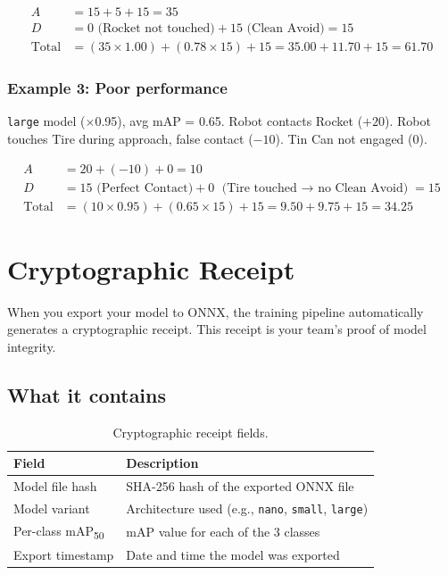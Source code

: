 \documentclass[a4]{article}
\begin{document}
\begin{align*}
A &= 15 + 5 + 15 = 35 \\
D &= 0 \text{ (Rocket not touched)} + 15 \text{ (Clean Avoid)} = 15 \\
\text{Total} &= (35 \times 1.00) + (0.78 \times 15) + 15 = 35.00 + 11.70 + 15 = \mathbf{61.70}
\end{align*}

\subsubsection*{Example 3: Poor performance}

\texttt{large} model ($\times$0.95), avg mAP = 0.65. Robot contacts Rocket ($+20$). Robot touches Tire during approach, false contact ($-10$). Tin Can not engaged ($0$).

\begin{align*}
A &= 20 + (-10) + 0 = 10 \\
D &= 15 \text{ (Perfect Contact)} + 0 \text{ (Tire touched $\rightarrow$ no Clean Avoid)} = 15 \\
\text{Total} &= (10 \times 0.95) + (0.65 \times 15) + 15 = 9.50 + 9.75 + 15 = \mathbf{34.25}
\end{align*}

\pagebreak
\section{Cryptographic Receipt}

When you export your model to ONNX, the training pipeline automatically generates a cryptographic receipt. This receipt is your team's proof of model integrity.

\subsection*{What it contains}

\begin{table}[H]
\centering
\begin{tabular}{ll}
\toprule
\textbf{Field} & \textbf{Description} \\
\midrule
Model file hash & SHA-256 hash of the exported ONNX file \\
Model variant & Architecture used (e.g., \texttt{nano}, \texttt{small}, \texttt{large}) \\
Per-class mAP\textsubscript{50} & mAP value for each of the 3 classes \\
Export timestamp & Date and time the model was exported \\
\bottomrule
\end{tabular}
\caption{Cryptographic receipt fields.}
\end{table}
\end{document}
